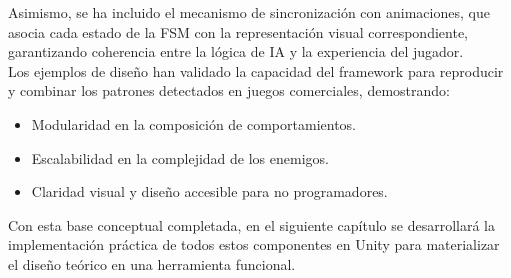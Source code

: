 Asimismo, se ha incluido el mecanismo de sincronización con animaciones, que asocia cada estado de la FSM con la representación visual correspondiente, garantizando coherencia entre la lógica de IA y la experiencia del jugador.\\

Los ejemplos de diseño han validado la capacidad del framework para reproducir y combinar los patrones detectados en juegos comerciales, demostrando:

\begin{itemize}
  \item Modularidad en la composición de comportamientos.
  \item Escalabilidad en la complejidad de los enemigos.
  \item Claridad visual y diseño accesible para no programadores.
\end{itemize}

Con esta base conceptual completada, en el siguiente capítulo se desarrollará la implementación práctica de todos estos componentes en Unity para materializar el diseño teórico en una herramienta funcional.
